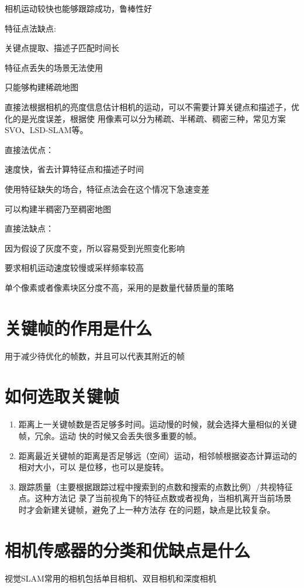 \documentclass[10pt]{article}
\begin{document}
相机运动较快也能够跟踪成功，鲁棒性好

\noindent 特征点法缺点:

关键点提取、描述子匹配时间长

特征点丢失的场景无法使用

只能够构建稀疏地图

直接法根据相机的亮度信息估计相机的运动，可以不需要计算关键点和描述子，优化的是光度误差，根据使
用像素可以分为稀疏、半稀疏、稠密三种，常见方案SVO、LSD-SLAM等。

\noindent 直接法优点：

速度快，省去计算特征点和描述子时间

使用特征缺失的场合，特征点法会在这个情况下急速变差

可以构建半稠密乃至稠密地图

\noindent 直接法缺点：

因为假设了灰度不变，所以容易受到光照变化影响

要求相机运动速度较慢或采样频率较高

单个像素或者像素块区分度不高，采用的是数量代替质量的策略

\section{关键帧的作用是什么}
用于减少待优化的帧数，并且可以代表其附近的帧

\section{如何选取关键帧}
\begin{enumerate}
    \item 距离上一关键帧数是否足够多时间。运动慢的时候，就会选择大量相似的关键帧，冗余。运动
    快的时候又会丢失很多重要的帧。
    \item 距离最近关键帧的距离是否足够远（空间）运动，相邻帧根据姿态计算运动的相对大小，可以
    是位移，也可以是旋转。
    \item 跟踪质量（主要根据跟踪过程中搜索到的点数和搜索的点数比例）/共视特征点。这种方法记
    录了当前视角下的特征点数或者视角，当相机离开当前场景时才会新建关键帧，避免了上一种方法存
    在的问题，缺点是比较复杂。
\end{enumerate}
\section{相机传感器的分类和优缺点是什么}
视觉SLAM常用的相机包括单目相机、双目相机和深度相机
\end{document}
